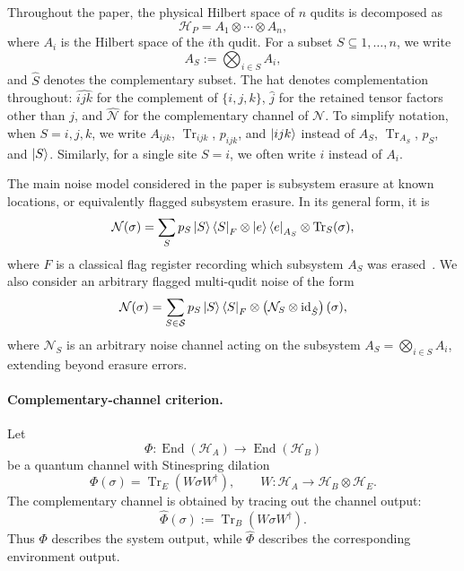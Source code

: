 \documentclass[10pt,twocolumn,superscriptaddress,aps,amsmath,amssymb,citeautoscript,floatfix,prx]{revtex4-2}
\theoremstyle{plain}
\theoremstyle{plain}
\theoremstyle{plain}
\theoremstyle{plain}
\theoremstyle{plain}
\theoremstyle{plain}
\theoremstyle{plain}
\theoremstyle{definition}
\theoremstyle{plain}
\begin{document}
Throughout the paper, the physical Hilbert space of $n$ qudits is decomposed as
$$
\mathcal H_P
=
A_1\otimes\cdots\otimes A_n,
$$
where $A_i$ is the Hilbert space of the $i$th qudit. For a subset $S\subseteq{1,\ldots,n}$, we write
$$
A_S
:=
\bigotimes_{i\in S}A_i,
$$
and $\hat S$ denotes the complementary subset. The hat denotes complementation throughout: $\widehat{ijk}$ for the complement of $\{i,j,k\}$, $\widehat j$ for the retained tensor factors other than $j$, 
and $\widehat{\mathcal N}$ for the complementary channel of $\mathcal N$. 
To simplify notation, when $S={i,j,k}$, we write $A_{ijk}$, $\operatorname{Tr}_{ijk}$, $p_{ijk}$, and $\ket{ijk}$ instead of $A_S$, $\operatorname{Tr}_{A_S}$, $p_S$, and $\ket S$. 
Similarly, for a single site $S={i}$, we often write $i$ instead of $A_i$.

The main noise model considered in the paper is subsystem erasure at known locations, or equivalently flagged subsystem erasure. In its general form, it is
\begin{equation}\label{eq:erasure_noise}
\mathcal N(\sigma)
=
\sum_S
p_S
\ket S\bra S_F
\otimes
\ket e\bra e_{A_S}
\otimes
\operatorname{Tr}_S(\sigma),
\end{equation}
where $F$ is a classical flag register recording which subsystem $A_S$ was erased~\cite{Faist2020}. 
We also consider an arbitrary flagged multi-qudit noise of the form
\begin{equation}\label{eq:arbitrary_multiqudit_noise}
\mathcal N(\sigma)
=
\sum_{S\in\mathcal S}
p_S
\ket S\bra S_F
\otimes
\left(
\mathcal N_S
\otimes
\mathrm{id}_{\hat S}
\right)(\sigma),
\end{equation}
where $\mathcal N_S$ is an arbitrary noise channel acting on the subsystem $A_S=\bigotimes_{i\in S}A_i$, extending beyond erasure errors.

\paragraph{Complementary-channel criterion.}

Let
$$
\Phi:\operatorname{End}(\mathcal H_A)\to\operatorname{End}(\mathcal H_B)
$$
be a quantum channel with Stinespring dilation
$$
\Phi(\sigma)
=
\operatorname{Tr}_E(W\sigma W^\dagger),
\qquad
W:\mathcal H_A\to\mathcal H_B\otimes\mathcal H_E .
$$
The complementary channel is obtained by tracing out the channel output:
$$
\widehat\Phi(\sigma)
:=
\operatorname{Tr}_B(W\sigma W^\dagger).
$$
Thus $\Phi$ describes the system output, while $\widehat\Phi$ describes the corresponding environment output.
\end{document}
